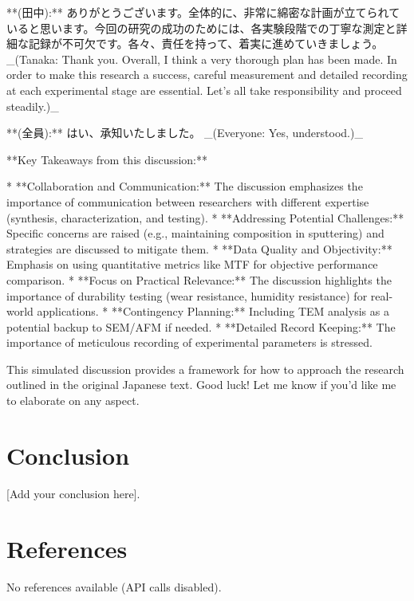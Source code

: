 \documentclass{article}
\begin{document}
**(田中):** ありがとうございます。全体的に、非常に綿密な計画が立てられていると思います。今回の研究の成功のためには、各実験段階での丁寧な測定と詳細な記録が不可欠です。各々、責任を持って、着実に進めていきましょう。
_(Tanaka: Thank you. Overall, I think a very thorough plan has been made. In order to make this research a success, careful measurement and detailed recording at each experimental stage are essential. Let's all take responsibility and proceed steadily.)_

**(全員):** はい、承知いたしました。
_(Everyone: Yes, understood.)_

**Key Takeaways from this discussion:**

*   **Collaboration and Communication:** The discussion emphasizes the importance of communication between researchers with different expertise (synthesis, characterization, and testing).
*   **Addressing Potential Challenges:** Specific concerns are raised (e.g., maintaining composition in sputtering) and strategies are discussed to mitigate them.
*   **Data Quality and Objectivity:**  Emphasis on using quantitative metrics like MTF for objective performance comparison.
*   **Focus on Practical Relevance:** The discussion highlights the importance of durability testing (wear resistance, humidity resistance) for real-world applications.
*   **Contingency Planning:**  Including TEM analysis as a potential backup to SEM/AFM if needed.
*   **Detailed Record Keeping:**  The importance of meticulous recording of experimental parameters is stressed.

This simulated discussion provides a framework for how to approach the research outlined in the original Japanese text. Good luck! Let me know if you'd like me to elaborate on any aspect.


\section{Conclusion}
[Add your conclusion here].

\section{References}
No references available (API calls disabled).
\end{document}
